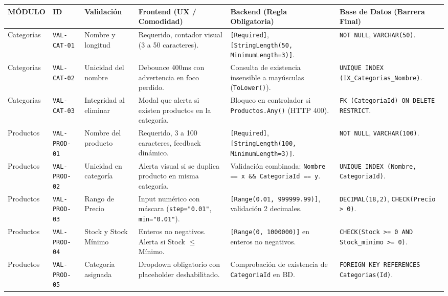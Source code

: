 \documentclass[10pt,a4paper,landscape]{article}
\begin{document}
\begin{table}[h!]
\centering
\small
\renewcommand{\arraystretch}{1.2}
\begin{tabularx}{\textwidth}{l l p{3.6cm} p{5.5cm} p{6.5cm} X}
\toprule
\rowcolor{headerbg}
\textbf{MÓDULO} & \textbf{ID} & \textbf{Validación} & \textbf{Frontend (UX / Comodidad)} & \textbf{Backend (Regla Obligatoria)} & \textbf{Base de Datos (Barrera Final)} \\
\midrule
Categorías & \texttt{VAL-CAT-01} & Nombre y longitud & Requerido, contador visual (3 a 50 caracteres). & \texttt{[Required]}, \texttt{[StringLength(50, MinimumLength=3)]}. & \texttt{NOT NULL}, \texttt{VARCHAR(50)}. \\
Categorías & \texttt{VAL-CAT-02} & Unicidad del nombre & Debounce 400ms con advertencia en foco perdido. & Consulta de existencia insensible a mayúsculas (\texttt{ToLower()}). & \texttt{UNIQUE INDEX (IX\_Categorias\_Nombre)}. \\
Categorías & \texttt{VAL-CAT-03} & Integridad al eliminar & Modal que alerta si existen productos en la categoría. & Bloqueo en controlador si \texttt{Productos.Any()} (HTTP 400). & \texttt{FK (CategoriaId) ON DELETE RESTRICT}. \\
\midrule
Productos & \texttt{VAL-PROD-01} & Nombre del producto & Requerido, 3 a 100 caracteres, feedback dinámico. & \texttt{[Required]}, \texttt{[StringLength(100, MinimumLength=3)]}. & \texttt{NOT NULL}, \texttt{VARCHAR(100)}. \\
Productos & \texttt{VAL-PROD-02} & Unicidad en categoría & Alerta visual si se duplica producto en misma categoría. & Validación combinada: \texttt{Nombre == x \&\& CategoriaId == y}. & \texttt{UNIQUE INDEX (Nombre, CategoriaId)}. \\
Productos & \texttt{VAL-PROD-03} & Rango de Precio & Input numérico con máscara (\texttt{step="0.01"}, \texttt{min="0.01"}). & \texttt{[Range(0.01, 999999.99)]}, validación 2 decimales. & \texttt{DECIMAL(18,2)}, \texttt{CHECK(Precio > 0)}. \\
Productos & \texttt{VAL-PROD-04} & Stock y Stock Mínimo & Enteros no negativos. Alerta si Stock $\le$ Mínimo. & \texttt{[Range(0, 1000000)]} en enteros no negativos. & \texttt{CHECK(Stock >= 0 AND Stock\_minimo >= 0)}. \\
Productos & \texttt{VAL-PROD-05} & Categoría asignada & Dropdown obligatorio con placeholder deshabilitado. & Comprobación de existencia de \texttt{CategoriaId} en BD. & \texttt{FOREIGN KEY REFERENCES Categorias(Id)}. \\

\end{tabularx}
\end{table}
\end{document}

